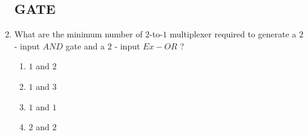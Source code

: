 \documentclass[12pt,-letter paper]{article}
\begin{document}
 \begin{enumerate}

          \subsection*{GATE}

 \item What are the minimum number of $2$-to-$1$ multiplexer required to generate a $2$- input $AND$ gate and a $2$ - input $Ex-OR$ ?
 \begin{enumerate}
 \item $1$ and $2$
 \item $1$ and $3$
 \item $1$ and $1$
 \item $2$ and $2$
 \end{enumerate}
\end {enumerate}
\end{document}

